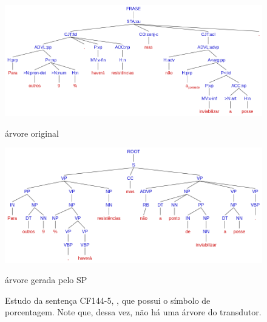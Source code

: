 \begin{figure}[!ht]
    \centering
    
    \begin{minipage}{.8\textwidth}
        \includegraphics[width=\linewidth]{imagens/ec_bosque_perc_orig.png}
        \caption{árvore original}
    \end{minipage}
    \begin{minipage}{.8\textwidth}
        \includegraphics[width=\linewidth]{imagens/ec_bosque_perc_sp.png}
        \caption{árvore gerada pelo SP}
    \end{minipage}
    
    
    \caption[Estudo de caso BOSQUE - Sentença transduzida com sinal de porcentagem]{Estudo da sentença CF144-5, , que possui o símbolo de porcentagem. Note que, dessa vez, não há uma árvore do transdutor.}
    \label{fig:ec_bosque_perc_tree}
\end{figure}

